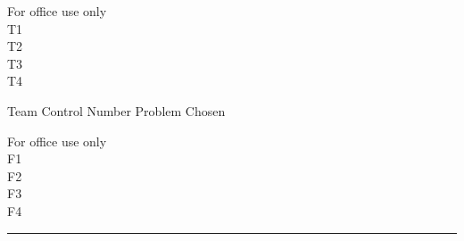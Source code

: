 \footnotesize
\begin{center}
    \begin{minipage}[c]{0.3\textwidth}
        \baselineskip
        \flushleft
        \begin{tabbing}
            For office use only\\
            T1\underline{\makebox[32.5mm][c]{}}\\
            T2\underline{\makebox[32.5mm][c]{}}\\
            T3\underline{\makebox[32.5mm][c]{}}\\
            T4\underline{\makebox[32.5mm][c]{}}
        \end{tabbing}
    \end{minipage}\qquad\qquad
    \begin{minipage}[c][3.5cm]{0.3\textwidth}
        \begin{center}
            Team Control Number
            \vfill
            {}
            \vfill
            \vfill
            Problem Chosen
            \vfill
        \end{center}
    \end{minipage}\qquad\qquad
    \begin{minipage}[c]{0.3\textwidth}
        \baselineskip
        \flushright
        \begin{tabbing}
            For office use only\\
            F1\underline{\makebox[32.5mm][c]{}}\\
            F2\underline{\makebox[32.5mm][c]{}}\\
            F3\underline{\makebox[32.5mm][c]{}}\\
            F4\underline{\makebox[32.5mm][c]{}}
        \end{tabbing}
    \end{minipage}
\end{center}

\bigskip
\vspace{-0.7cm}
{\noindent\color{gray}\rule[0.25\baselineskip]{\textwidth}{1.5pt}}
